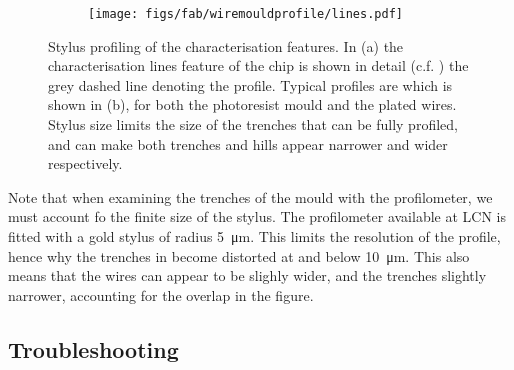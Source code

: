 \begin{figure}[h]
  \centering
  \begin{subfigure}[b]{0.3\textwidth}
    \texttt{[image: figs/fab/wiremouldprofile/lines.pdf]}
    \vspace{1cm}
    \caption{}
  \end{subfigure}
  \hspace{1cm}
  \begin{subfigure}[b]{0.55\textwidth}
    \caption{}
  \end{subfigure}
  \caption{Stylus profiling of the characterisation features. In (a) the
  characterisation lines feature of the chip is shown in detail (c.f.
  ) the grey dashed line denoting the
  profile. Typical profiles are which is shown in (b), for both the photoresist
  mould and the plated wires. Stylus size limits the size of the trenches that
  can be fully profiled, and can make both trenches and hills appear narrower
  and wider respectively.
  }
  \label{fab:fig:chipprofile}
\end{figure}

Note that when examining the trenches of the mould with the profilometer, we
must account fo the finite size of the stylus.
The profilometer available at LCN is fitted with a gold stylus of radius
\SI{5}{\micro\meter}. This limits the resolution of the profile, hence why the
trenches in  become distorted at and below
\SI{10}{\micro\meter}. This also means that the wires can appear to be slighly
wider, and the trenches slightly narrower, accounting for the overlap in the
figure.

\subsection{Troubleshooting}

